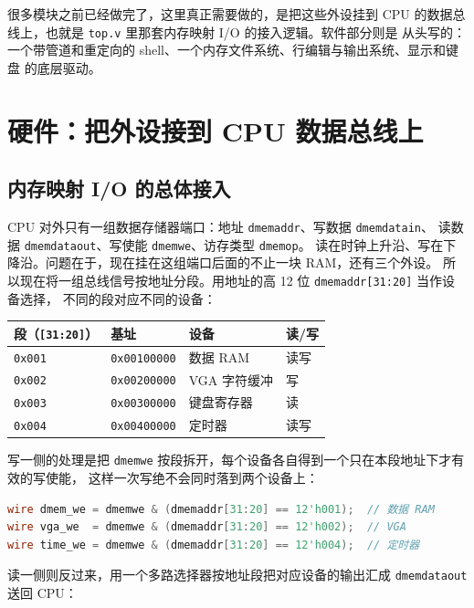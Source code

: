 \documentclass[12pt, a4paper]{ctexart}
\begin{document}
很多模块之前已经做完了，这里真正需要做的，是把这些外设挂到 CPU
的数据总线上，也就是 \lstinline|top.v| 里那套内存映射 I/O 的接入逻辑。软件部分则是
从头写的：一个带管道和重定向的 shell、一个内存文件系统、行编辑与输出系统、显示和键盘
的底层驱动。

\section{硬件：把外设接到 CPU 数据总线上}

\subsection{内存映射 I/O 的总体接入}

CPU 对外只有一组数据存储器端口：地址 \lstinline|dmemaddr|、写数据 \lstinline|dmemdatain|、
读数据 \lstinline|dmemdataout|、写使能 \lstinline|dmemwe|、访存类型 \lstinline|dmemop|。
读在时钟上升沿、写在下降沿。问题在于，现在挂在这组端口后面的不止一块 RAM，还有三个外设。
所以现在将一组总线信号按地址分段。用地址的高 12 位 \lstinline|dmemaddr[31:20]| 当作设备选择，
不同的段对应不同的设备：

\begin{table}[H]
\centering
\begin{tabular}{llll}
\toprule
段（\lstinline|[31:20]|） & 基址 & 设备 & 读/写 \\
\midrule
\lstinline|0x001| & \lstinline|0x00100000| & 数据 RAM & 读写 \\
\lstinline|0x002| & \lstinline|0x00200000| & VGA 字符缓冲 & 写 \\
\lstinline|0x003| & \lstinline|0x00300000| & 键盘寄存器 & 读 \\
\lstinline|0x004| & \lstinline|0x00400000| & 定时器 & 读写 \\
\bottomrule
\end{tabular}
\end{table}

写一侧的处理是把 \lstinline|dmemwe| 按段拆开，每个设备各自得到一个只在本段地址下才有效的写使能，
这样一次写绝不会同时落到两个设备上：

\begin{lstlisting}[language=Verilog]
wire dmem_we = dmemwe & (dmemaddr[31:20] == 12'h001);  // 数据 RAM
wire vga_we  = dmemwe & (dmemaddr[31:20] == 12'h002);  // VGA
wire time_we = dmemwe & (dmemaddr[31:20] == 12'h004);  // 定时器
\end{lstlisting}

读一侧则反过来，用一个多路选择器按地址段把对应设备的输出汇成 \lstinline|dmemdataout|
送回 CPU：
\end{document}
